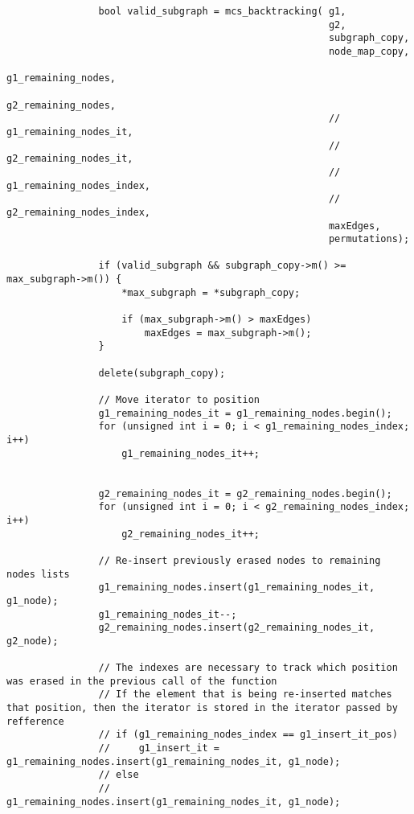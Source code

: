 \begin{lstlisting}
                bool valid_subgraph = mcs_backtracking( g1,
                                                        g2,
                                                        subgraph_copy,
                                                        node_map_copy,
                                                        g1_remaining_nodes,
                                                        g2_remaining_nodes,
                                                        // g1_remaining_nodes_it,
                                                        // g2_remaining_nodes_it,
                                                        // g1_remaining_nodes_index,
                                                        // g2_remaining_nodes_index,
                                                        maxEdges,
                                                        permutations);

                if (valid_subgraph && subgraph_copy->m() >= max_subgraph->m()) {
                    *max_subgraph = *subgraph_copy;

                    if (max_subgraph->m() > maxEdges)
                        maxEdges = max_subgraph->m();
                }

                delete(subgraph_copy);

                // Move iterator to position
                g1_remaining_nodes_it = g1_remaining_nodes.begin();
                for (unsigned int i = 0; i < g1_remaining_nodes_index; i++)
                    g1_remaining_nodes_it++;


                g2_remaining_nodes_it = g2_remaining_nodes.begin();
                for (unsigned int i = 0; i < g2_remaining_nodes_index; i++)
                    g2_remaining_nodes_it++;

                // Re-insert previously erased nodes to remaining nodes lists
                g1_remaining_nodes.insert(g1_remaining_nodes_it, g1_node);
                g1_remaining_nodes_it--;
                g2_remaining_nodes.insert(g2_remaining_nodes_it, g2_node);

                // The indexes are necessary to track which position was erased in the previous call of the function
                // If the element that is being re-inserted matches that position, then the iterator is stored in the iterator passed by refference
                // if (g1_remaining_nodes_index == g1_insert_it_pos)
                //     g1_insert_it = g1_remaining_nodes.insert(g1_remaining_nodes_it, g1_node);
                // else
                //     g1_remaining_nodes.insert(g1_remaining_nodes_it, g1_node);


\end{lstlisting}

